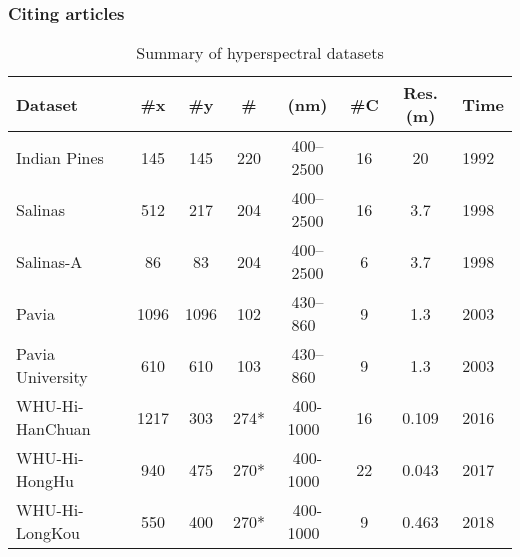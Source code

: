 %
%

\begin{frame}
  \frametitle{Citing articles}

  \begin{table}[h!]
    \centering
    \caption{Summary of hyperspectral datasets}
    \label{tab:datasets}
    \begin{tabular}{lccccccl}
    \hline
    \textbf{Dataset} & \textbf{\#x} & \textbf{\#y} & \textbf{\#\bm{$\lambda$}} & \textbf{\bm{$\lambda$} (nm)} & \textbf{\#C} & \textbf{Res. (m)}  &Time\\
    \hline
    Indian Pines\footnotemark[1] & 145 & 145 & 220 & 400--2500 & 16 & 20  &1992\\
    Salinas\footnotemark[2] & 512 & 217 & 204 & 400--2500 & 16 & 3.7  &1998\\
    Salinas-A\footnotemark[2] & 86 & 83 & 204 & 400--2500 & 6 & 3.7  &1998\\
    Pavia\footnotemark[3] & 1096 & 1096 & 102 & 430--860~ & 9 & 1.3  &2003\\
    Pavia University\footnotemark[3] & 610 & 610 & 103 & 430--860~ & 9 & 1.3  &2003\\
    WHU-Hi-HanChuan & 1217& 303& 274*& 400-1000~& 16& 0.109&2016\\
     WHU-Hi-HongHu& 940& 475& 270*& 400-1000~& 22& 0.043&2017\\
     WHU-Hi-LongKou& 550& 400& 270*& 400-1000~& 9& 0.463&2018\\
     \hline
    \end{tabular}
    \end{table}
\end{frame}


